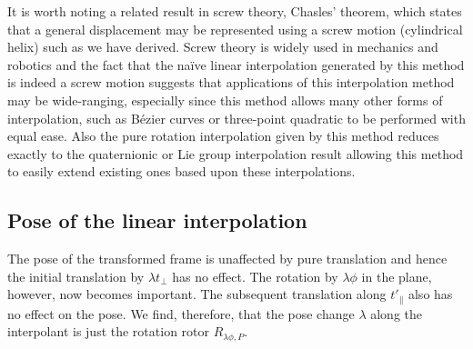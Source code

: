 It is worth noting a related result in screw theory, Chasles' theorem, which
states that a general displacement may be represented using a screw motion
(cylindrical helix) such as we have derived. Screw theory is widely used in
mechanics and robotics and the fact that the na\"ive linear interpolation
generated by this method is indeed a screw motion suggests that
applications of this interpolation method may be wide-ranging, especially since
this method allows many other forms of interpolation, such as B\'ezier curves
or three-point quadratic to be performed with equal ease. Also the pure
rotation interpolation given by this method reduces exactly to the quaternionic
or Lie group interpolation result allowing this method to easily extend
existing ones based upon these interpolations.

\subsection{Pose of the linear interpolation}

The pose of the transformed frame is unaffected by pure translation and hence the initial
translation by $\lambda t_\perp$ has no effect. The rotation by $\lambda \phi$ in the plane,
however, now becomes important. The subsequent translation along $t'_\parallel$ also has
no effect on the pose. We find, therefore, that the pose change $\lambda$ along the 
interpolant is just the rotation rotor $R_{\lambda \phi, P}$.




